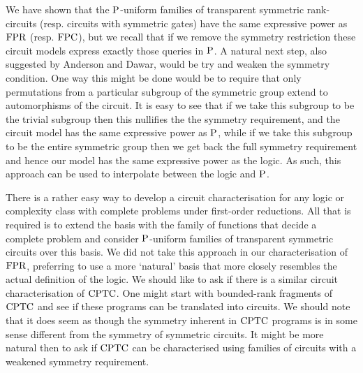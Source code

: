 \documentclass[../paper.tex]{subfiles}
\begin{document}
We have shown that the $\mathrm{P}$-uniform families of transparent symmetric
rank-circuits (resp. circuits with symmetric gates) have the same expressive
power as $\text{\upshape FPR}$ (resp. $\text{\upshape FPC}$), but we recall that if we remove the symmetry
restriction these circuit models express exactly those queries in $\mathrm{P}$. A
natural next step, also suggested by Anderson and Dawar, would be try and weaken
the symmetry condition. One way this might be done would be to require that only
permutations from a particular subgroup of the symmetric group extend to
automorphisms of the circuit. It is easy to see that if we take this subgroup to
be the trivial subgroup then this nullifies the the symmetry requirement, and
the circuit model has the same expressive power as $\mathrm{P}$, while if we take this
subgroup to be the entire symmetric group then we get back the full symmetry
requirement and hence our model has the same expressive power as the logic. As
such, this approach can be used to interpolate between the logic and $\mathrm{P}$.

There is a rather easy way to develop a circuit characterisation for any logic
or complexity class with complete problems under first-order reductions. All
that is required is to extend the basis with the family of functions that decide
a complete problem and consider $\mathrm{P}$-uniform families of transparent symmetric
circuits over this basis. We did not take this approach in our characterisation
of $\text{\upshape FPR}$, preferring to use a more `natural' basis that more closely resembles
the actual definition of the logic. We should like to ask if there is a similar
circuit characterisation of $\text{\upshape CPTC}$. One might start with bounded-rank fragments
of $\text{\upshape CPTC}$ and see if these programs can be translated into circuits. We should
note that it does seem as though the symmetry inherent in $\text{\upshape CPTC}$ programs is in
some sense different from the symmetry of symmetric circuits. It might be more
natural then to ask if $\text{\upshape CPTC}$ can be characterised using families of circuits
with a weakened symmetry requirement.


\end{document}
